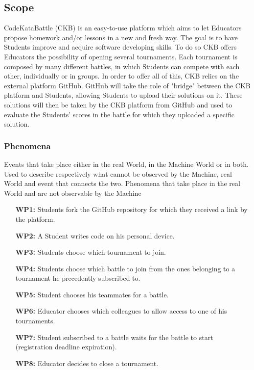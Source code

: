 \documentclass{article}
\newcounter{subsubsubsection}[subsubsection]
\begin{document}
\subsection{Scope}
CodeKataBattle (CKB) is an easy-to-use platform which aims to let Educators propose homework and/or lessons in a new and fresh way. 
The goal is to have Students improve and acquire software developing skills. To do so CKB offers Educators the possibility of opening 
several tournaments. Each tournament is composed by many different battles, in which Students can compete with each other, individually or in groups.
In order to offer all of this, CKB relies on the external platform GitHub. GitHub will take the role of "bridge" between the CKB platform and Students, 
allowing Students to upload their solutions on it. These solutions will then be taken by the CKB platform from GitHub and used to evaluate the Students' scores 
in the battle for which they uploaded a specific solution.
\subsubsection{Phenomena}
Events that take place either in the real World, in the Machine World or in both. Used to describe respectively what cannot be observed by the Machine, real 
World and event that connects the two.
Phenomena that take place in the real World and are not observable by the Machine
\begin{enumerate}
    \item[\textbf{WP1:}] Students fork the GitHub repository for which they received a link by the platform.
    \item[\textbf{WP2:}] A Student writes code on his personal device.
    \item[\textbf{WP3:}] Students choose which tournament to join.
    \item[\textbf{WP4:}] Students choose which battle to join from the ones belonging to a tournament he precedently subscribed to.
    \item[\textbf{WP5:}] Student chooses his teammates for a battle.
    \item[\textbf{WP6:}] Educator chooses which colleagues to allow access to one of his tournaments.
    \item[\textbf{WP7:}] Student subscribed to a battle waits for the battle to start (registration deadline expiration).
    \item[\textbf{WP8:}] Educator decides to close a tournament.
\end{enumerate}
\end{document}

